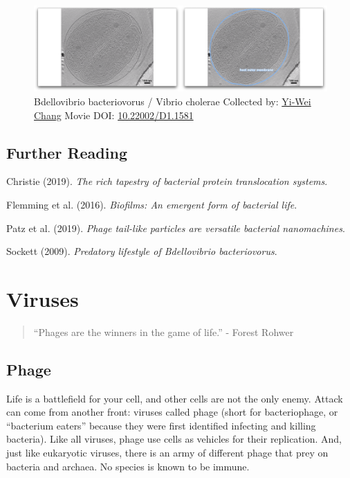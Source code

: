 \documentclass[]{tufte-book}
\begin{document}
\begin{figure}
\includegraphics{movie_stills/9_11} \caption[Bdellovibrio bacteriovorus / Vibrio cholerae Collected by:
\protect\hyperlink{yi-wei_chang}{Yi-Wei Chang} Movie DOI:
\href{https://doi.org/10.22002/D1.1581}{10.22002/D1.1581}]{Bdellovibrio bacteriovorus / Vibrio cholerae Collected by:
\protect\hyperlink{yi-wei_chang}{Yi-Wei Chang} Movie DOI:
\href{https://doi.org/10.22002/D1.1581}{10.22002/D1.1581}}\label{fig:9-11}
\end{figure}

\section{Further Reading}\label{further-reading}

Christie (2019). \emph{The rich tapestry of bacterial protein
translocation systems}.\citep{christie2019}

Flemming et al. (2016). \emph{Biofilms: An emergent form of bacterial
life}.\citep{flemming2016}

Patz et al. (2019). \emph{Phage tail-like particles are versatile
bacterial nanomachines}.\citep{patz2019}

Sockett (2009). \emph{Predatory lifestyle of Bdellovibrio
bacteriovorus}.\citep{sockett2009}

\chapter{Viruses}\label{viruses}

\begin{quote}
``Phages are the winners in the game of life.'' - Forest Rohwer
\citep{rohwer2014}
\end{quote}

\section{Phage}\label{phage}

Life is a battlefield for your cell, and other cells are not the only
enemy. Attack can come from another front: viruses called phage (short
for bacteriophage, or ``bacterium eaters'' because they were first
identified infecting and killing bacteria). Like all viruses, phage use
cells as vehicles for their replication. And, just like eukaryotic
viruses, there is an army of different phage that prey on bacteria and
archaea. No species is known to be immune.
\end{document}
